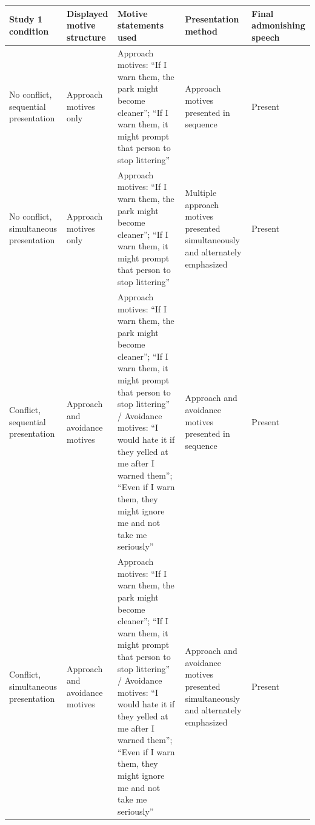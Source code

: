 {\def\LTcaptype{none} %
\begin{longtable}[]{@{}
  >{\raggedright\arraybackslash}p{}
  >{\raggedright\arraybackslash}p{}
  >{\raggedright\arraybackslash}p{}
  >{\raggedright\arraybackslash}p{}
  >{\raggedright\arraybackslash}p{}@{}}
\toprule\noalign{}
\begin{minipage}[b]{\linewidth}\raggedright
Study 1 condition
\end{minipage} & \begin{minipage}[b]{\linewidth}\raggedright
Displayed motive structure
\end{minipage} & \begin{minipage}[b]{\linewidth}\raggedright
Motive statements used
\end{minipage} & \begin{minipage}[b]{\linewidth}\raggedright
Presentation method
\end{minipage} & \begin{minipage}[b]{\linewidth}\raggedright
Final admonishing speech
\end{minipage} \\
\midrule\noalign{}
\endhead
\bottomrule\noalign{}
\endlastfoot
No conflict, sequential presentation & Approach motives only & Approach
motives: ``If I warn them, the park might become cleaner''; ``If I warn
them, it might prompt that person to stop littering'' & Approach motives
presented in sequence & Present \\
No conflict, simultaneous presentation & Approach motives only &
Approach motives: ``If I warn them, the park might become cleaner'';
``If I warn them, it might prompt that person to stop littering'' &
Multiple approach motives presented simultaneously and alternately
emphasized & Present \\
Conflict, sequential presentation & Approach and avoidance motives &
Approach motives: ``If I warn them, the park might become cleaner'';
``If I warn them, it might prompt that person to stop littering'' /
Avoidance motives: ``I would hate it if they yelled at me after I warned
them''; ``Even if I warn them, they might ignore me and not take me
seriously'' & Approach and avoidance motives presented in sequence &
Present \\
Conflict, simultaneous presentation & Approach and avoidance motives &
Approach motives: ``If I warn them, the park might become cleaner'';
``If I warn them, it might prompt that person to stop littering'' /
Avoidance motives: ``I would hate it if they yelled at me after I warned
them''; ``Even if I warn them, they might ignore me and not take me
seriously'' & Approach and avoidance motives presented simultaneously
and alternately emphasized & Present \\
\end{longtable}
}

